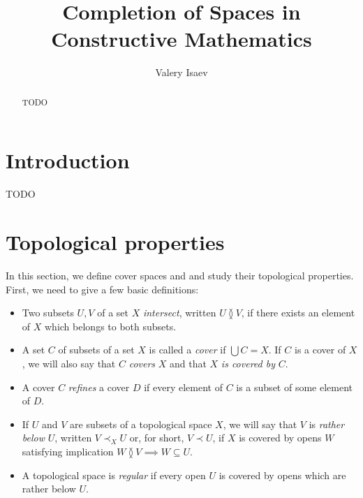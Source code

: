 \documentclass[reqno]{amsart}
\theoremstyle{definition}
\theoremstyle{remark}
\numberwithin{figure}{section}
\newcommand{\overlap}[2]{#1 \between #2}
\newcommand{\rb}{\prec}
\begin{document}
\title{Completion of Spaces in Constructive Mathematics}

\author{Valery Isaev}

\begin{abstract}
TODO
\end{abstract}

\maketitle

\section{Introduction}

TODO

\section{Topological properties}

In this section, we define cover spaces and and study their topological properties.
First, we need to give a few basic definitions:
\begin{itemize}
\item Two subsets $U,V$ of a set $X$ \emph{intersect}, written $\overlap{U}{V}$, if there exists an element of $X$ which belongs to both subsets.
\item A set $C$ of subsets of a set $X$ is called a \emph{cover} if $\bigcup C = X$. If $C$ is a cover of $X$, we will also say that $C$ \emph{covers} $X$ and that $X$ \emph{is covered by} $C$.
\item A cover $C$ \emph{refines} a cover $D$ if every element of $C$ is a subset of some element of $D$.
\item If $U$ and $V$ are subsets of a topological space $X$, we will say that $V$ is \emph{rather below} $U$, written $V \rb_X U$ or, for short, $V \rb U$, if $X$ is covered by opens $W$ satisfying implication $\overlap{W}{V} \implies W \subseteq U$.
\item A topological space is \emph{regular} if every open $U$ is covered by opens which are rather below $U$.
\end{itemize}
\end{document}
